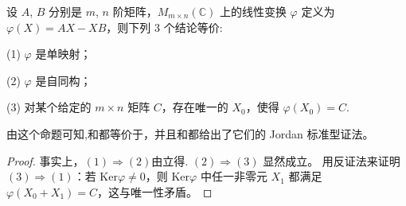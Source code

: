 \documentclass[../../main.tex]{subfiles}%
\begin{document}
\begin{proposition}\label{proposition:AX-XB线性映射相关等价条件}
设 $A$, $B$ 分别是 $m$, $n$ 阶矩阵，$M_{m\times n}(\mathbb{C})$ 上的线性变换 $\varphi$ 定义为 $\varphi(X) = AX - XB$，则下列 3 个结论等价:

(1) $\varphi$ 是单映射；

(2) $\varphi$ 是自同构；

(3) 对某个给定的 $m \times n$ 矩阵 $C$，存在唯一的 $X_0$，使得 $\varphi(X_0) = C$.
\end{proposition}
\begin{remark}
由这个命题可知,和都等价于，并且和都给出了它们的 Jordan 标准型证法。
\end{remark}
\begin{proof}
事实上，$(1) \Rightarrow (2)$由立得. 
$(2) \Rightarrow (3)$ 显然成立。
用反证法来证明 $(3) \Rightarrow (1)$：若 $\mathrm{Ker}\varphi \neq 0$，则 $\mathrm{Ker}\varphi$ 中任一非零元 $X_1$ 都满足 $\varphi(X_0 + X_1) = C$，这与唯一性矛盾。
\end{proof}
\end{document}
